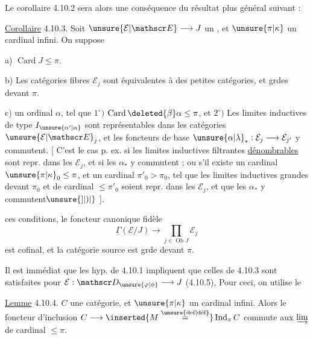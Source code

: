 Le corollaire 4.10.2 sera alors une conséquence du résultat plus général  suivant :

\uline{Corollaire} 4.10.3. Soit $\unsure{\mathcal E|\mathscr E}\longrightarrow J$ un   , et $\unsure{\pi|\kappa}$ un cardinal infini. On suppose 

a) $\operatorname{Card}J\leq\pi$.

b) Les catégories fibres $\mathcal E_j$ sont équivalentes à des petites catégories, et grdes devant $\pi$.

c)   un ordinal   $\alpha$, tel que $1^\circ)$  $\operatorname{Card}\deleted{\beta}\alpha\leq\pi$, et
$2^\circ)$ Les limites inductives de type $I_{\unsure{\alpha'|\alpha}}$ sont représentables dans les catégories $\unsure{\mathcal E|\mathscr E}_j$, et les foncteurs  de base $\unsure{\alpha|\lambda}_*:\mathcal E_j\longrightarrow\mathcal E_{j'}$ y commutent.
[ C'est le cas p. ex. si les limites inductives filtrantes \uline{dénombrables} sont repr. dans les $\mathcal E_j$, et si les $\alpha_*$ y commutent ; ou s'il existe un cardinal $\unsure{\pi|\kappa}_0\leq\pi$, et un cardinal $\pi'_0>\pi_0$, tel que les limites inductives grandes devant $\pi_0$ et de cardinal $\leq\pi'_0$ soient repr. dans les $\mathcal E_j$, et que les $\alpha_*$ y commutent$\unsure{]|)|{}}$ ].

\margin{$\unsure{]\!]|]|\parallel}$} ces conditions, le foncteur canonique fidèle
\[
 \underline{\Gamma}(\mathcal E/J)\longrightarrow\prod_{j\in\operatorname{Ob}J}\mathcal E_j \tag*{(4.10.3.1)}
\]
est cofinal, et la catégorie source est grde devant $\pi$.

Il est \inserted{$\pm$} immédiat que les hyp. de 4.10.1 impliquent que celles de 4.10.3 sont satisfaites pour $\mathcal E:\mathscr D_{\unsure{\varphi|\phi}}\longrightarrow J$ (4.10.5), Pour
ceci, on utilise le

\uline{Lemme} 4.10.4.  $C$ une catégorie, et $\unsure{\pi|\kappa}$ un cardinal infini. Alors le foncteur d'inclusion $C\longrightarrow\inserted{M\overset{\unsure{\text{def}|\text{déf}}}{=}}\operatorname{Ind}_{\pi} C$ commute aux $\varinjlim$ de cardinal $\leq\pi$.
\margin{\rule{0.4pt}{4\baselineskip}}


